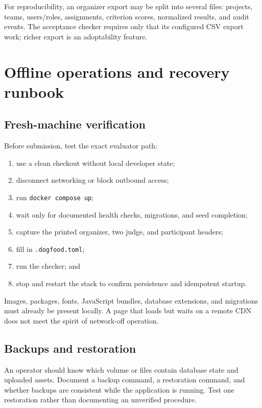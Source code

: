 For reproducibility, an organizer export may be split into several files: projects, teams, users/roles, assignments, criterion scores, normalized results, and audit events. The acceptance checker requires only that its configured CSV export work; richer export is an adoptability feature.

\section{Offline operations and recovery runbook}

\advisory\par


\subsection{Fresh-machine verification}

Before submission, test the exact evaluator path:

\begin{enumerate}
  \item use a clean checkout without local developer state;
  \item disconnect networking or block outbound access;
  \item run \texttt{docker compose up};
  \item wait only for documented health checks, migrations, and seed completion;
  \item capture the printed organizer, two judge, and participant headers;
  \item fill in \texttt{.dogfood.toml};
  \item run the checker; and
  \item stop and restart the stack to confirm persistence and idempotent startup.
\end{enumerate}

Images, packages, fonts, JavaScript bundles, database extensions, and migrations must already be present locally. A page that loads but waits on a remote CDN does not meet the spirit of network-off operation.

\subsection{Backups and restoration}

An operator should know which volume or files contain database state and uploaded assets. Document a backup command, a restoration command, and whether backups are consistent while the application is running. Test one restoration rather than documenting an unverified procedure.

